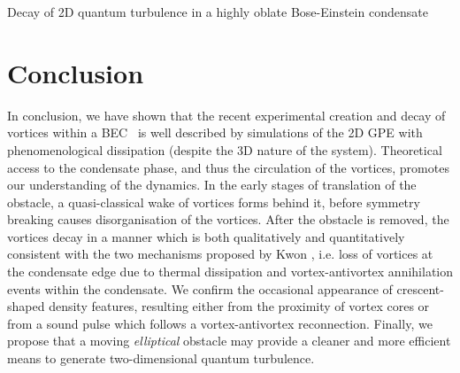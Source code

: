 \begin{chapter}{\label{cha:shin}Decay of 2D quantum turbulence in a highly oblate Bose-Einstein condensate}
\section{Conclusion}
In conclusion, we have shown that the recent experimental creation and decay of vortices within a BEC~\citep{kwon_moon_14} is well described by simulations of the 2D GPE with phenomenological dissipation (despite the 3D nature of the system).  Theoretical access to the condensate phase, and thus the circulation of the vortices, promotes our understanding of the dynamics.  In the early stages of 
translation of the obstacle, a quasi-classical wake of vortices 
forms behind it, before symmetry breaking causes disorganisation 
of the vortices.  After the obstacle is removed, 
the vortices decay in a manner which is both qualitatively and 
quantitatively consistent with the two mechanisms proposed by 
Kwon \etalcc, i.e. loss of vortices at the condensate edge due to thermal dissipation and vortex-antivortex 
annihilation events within the condensate. 
We confirm the occasional appearance of 
crescent-shaped density features, resulting either from the proximity 
of vortex cores or from a sound pulse which follows a 
vortex-antivortex reconnection.  Finally, we propose that a moving {\it elliptical} obstacle may provide a cleaner and more efficient means to generate two-dimensional quantum turbulence.
\end{chapter}
